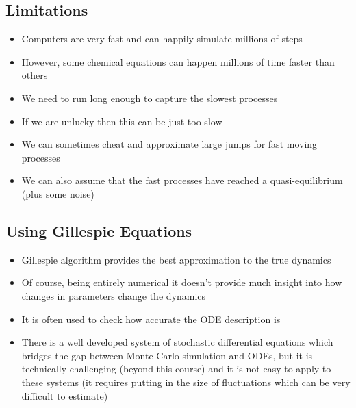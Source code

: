 \begin{slide}
\section{Limitations}

\begin{PauseHighLight}
  \begin{itemize}
  \item Computers are very fast and can happily simulate millions of
    steps\pause
  \item However, some chemical equations can happen millions of time
    faster than others\pause
  \item We need to run long enough to capture the slowest
    processes\pause
  \item If we are unlucky then this can be just too slow\pause
  \item We can sometimes cheat and approximate large jumps for fast
    moving processes\pause
  \item We can also assume that the fast processes have reached a
    quasi-equilibrium (plus some noise)\pause
  \end{itemize}
\end{PauseHighLight}

\end{slide}


\begin{slide}
\section{Using Gillespie Equations}

\begin{PauseHighLight}
  \begin{itemize}
  \item Gillespie algorithm provides the best approximation to the true
    dynamics\pause
  \item Of course, being entirely numerical it doesn't provide much
    insight into how changes in parameters change the dynamics\pause
  \item It is often used to check how accurate the ODE description
    is\pause
  \item There is a well developed system of stochastic differential
    equations which bridges the gap between Monte Carlo simulation and
    ODEs, but it is technically challenging (beyond this course) and it
    is not easy to apply to these systems (it requires putting in
    the size of fluctuations which can be very difficult to
    estimate)\pause
  \end{itemize}
\end{PauseHighLight}

\end{slide}


